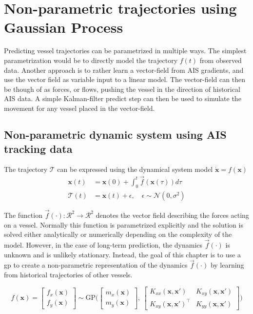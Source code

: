 \chapter{Non-parametric trajectories using Gaussian Process}\label{chap:impl}
Predicting vessel trajectories can be parametrized in multiple ways. The simplest parametrization would be to directly model the trajectory $f(t)$ from observed data. Another approach is to rather learn a vector-field from AIS gradients, and use the vector field as variable input to a linear model. The vector-field can then be though of as forces, or flows, pushing the vessel in the direction of historical AIS data. A simple Kalman-filter predict step can then be used to simulate the movement for any vessel placed in the vector-field. 


\section{Non-parametric dynamic system using AIS tracking data}
The trajectory $\mathcal{T}$ can be expressed using the dynamical system model $\dot{\boldsymbol{x}} = f(\boldsymbol{x})$
\begin{subequations}
\begin{align}
    \boldsymbol{x}(t) &= \boldsymbol{x}(0) + \int_0^t \vec{f}(\boldsymbol{x}(\tau)) d\tau \\
    \mathcal{T}(t) &= \boldsymbol{x}(t) + \epsilon, \quad \epsilon \sim \mathcal{N}(0, \sigma^2)
\end{align}
\end{subequations}

The function $\vec{f}(\cdot): \mathcal{R}^2 \to \mathcal{R}^2$ denotes the vector field describing the forces acting on a vessel. Normally this function is parametrized explicitly and the solution is solved either analytically or numerically depending on the complexity of the model. However, in the case of long-term prediction, the dynamics $\vec{f}(\cdot)$ is unknown and is unlikely stationary. Instead, the goal of this chapter is to use a \acrshort{gp} to create a non-parametric representation of the dynamics $\vec{f}(\cdot)$ by learning from historical trajectories of other vessels.

\begin{equation}\label{eq:gp_vec_field}
    f(\boldsymbol{x}) = \begin{bmatrix} f_x (\boldsymbol{x})\\ f_y (\boldsymbol{x})\end{bmatrix} \sim \text{GP} \big(\begin{bmatrix} m_x(\boldsymbol{x})\\m_y(\boldsymbol{x})\end{bmatrix}, \ \begin{bmatrix}
    K_{xx}(\boldsymbol{x}, \boldsymbol{x}') & K_{xy}(\boldsymbol{x}, \boldsymbol{x}') \\ K_{xy}(\boldsymbol{x}, \boldsymbol{x}')^\intercal & K_{yy}(\boldsymbol{x}, \boldsymbol{x}')
    \end{bmatrix}\big) 
\end{equation}

